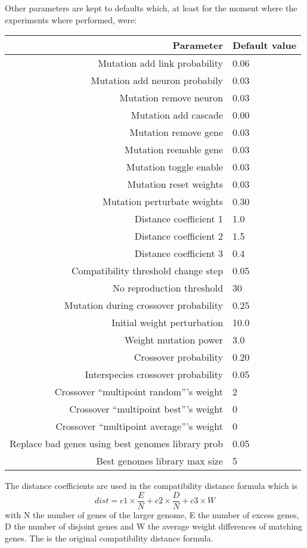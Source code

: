 Other parameters are kept to defaults which, at least for the moment where the
experiments where performed, were:

\begin{tabular}{rl}
    \toprule
    Parameter & Default value \\
    \midrule
    Mutation add link probability & 0.06 \\
    Mutation add neuron probabily & 0.03 \\
    Mutation remove neuron & 0.03 \\
    Mutation add cascade & 0.00 \\
    Mutation remove gene & 0.03 \\
    Mutation reenable gene & 0.03 \\
    Mutation toggle enable & 0.03 \\
    Mutation reset weights & 0.03 \\
    Mutation perturbate weights & 0.30 \\[1ex]

    Distance coefficient 1 & 1.0 \\
    Distance coefficient 2 & 1.5 \\
    Distance coefficient 3 & 0.4 \\
    Compatibility threshold change step & 0.05 \\[1ex]

    No reproduction threshold & 30 \\
    Mutation during crossover probability & 0.25 \\
    Initial weight perturbation & 10.0 \\
    Weight mutation power & 3.0 \\[1ex]

    Crossover probability & 0.20 \\
    Interspecies crossover probability & 0.05 \\
    Crossover ``multipoint random'''s weight & 2 \\
    Crossover ``multipoint best'''s weight & 0 \\
    Crossover ``multipoint average'''s weight & 0 \\[1ex]

    Replace bad genes using best genomes library prob & 0.05 \\
    Best genomes library max size & 5 \\
    \bottomrule
\end{tabular}

The distance coefficients are used in the compatibility distance formula which is
\[dist = c1 × \frac{E}{N} + c2 × \frac{D}{N} + c3 × W\]
with N the number of genes of the larger genome, E the number of excess genes,
D the number of disjoint genes and W the average weight differences of matching genes.
The is the original compatibility distance formula.~\cite{StMi02}

